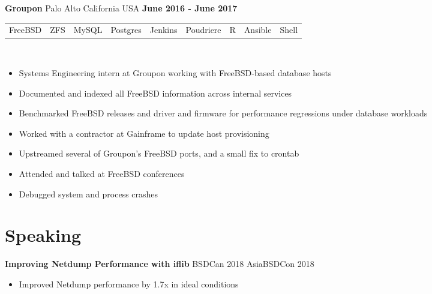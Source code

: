 \documentclass[resmargin,line,12pt]{res}
\begin{document}
{\begin{resume}
{\bf Groupon} Palo Alto California USA \hfill {\bf June 2016 - June 2017} \
\\
\begin{tabular}{l l l l l l l l l}
  FreeBSD & ZFS & MySQL & Postgres & Jenkins & Poudriere & R & Ansible & Shell
\end{tabular}
\\
\vspace{-.16in}
\begin{itemize}
  \item Systems Engineering intern at Groupon working with FreeBSD-based database hosts
  \item Documented and indexed all FreeBSD information across internal services
  \item Benchmarked FreeBSD releases and driver and firmware for performance regressions under database workloads
  \item Worked with a contractor at Gainframe to update host provisioning
  \item Upstreamed several of Groupon's FreeBSD ports, and a small fix to
    crontab
  \item Attended and talked at FreeBSD conferences
  \item Debugged system and process crashes
\end{itemize}
\vspace{-.10in}


\vspace*{.20in}
{\color{Black}
  \vspace{-.13in}
  \section{\sc Speaking}}

\color{black}
{\bf Improving Netdump Performance with iflib} BSDCan 2018 AsiaBSDCon 2018\\
\vspace{-.16in}
\begin{itemize}
\item Improved Netdump performance by 1.7x in ideal conditions
\end{itemize}
\vspace{-.10in}


\end{resume}}
\end{document}
